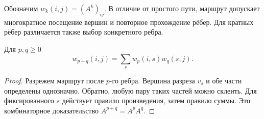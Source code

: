 \begin{definition}
Обозначим \(w_k(i,j)=(A^k)_{ij}\). В отличие от простого пути, маршрут
допускает многократное посещение вершин и повторное прохождение рёбер.
Для кратных рёбер различается также выбор конкретного ребра.
\end{definition}
\begin{lemma}
Для \(p,q\ge0\)
\[
 w_{p+q}(i,j)=\sum_s w_p(i,s)w_q(s,j).
\]
\end{lemma}
\begin{proof}
Разрежем маршрут после \(p\)-го ребра. Вершина разреза \(v_s\) и обе
части определены однозначно. Обратно, любую пару таких частей можно
склеить. Для фиксированного \(s\) действует правило произведения,
затем правило суммы. Это комбинаторное доказательство \(A^{p+q}=A^pA^q\).
\end{proof}


